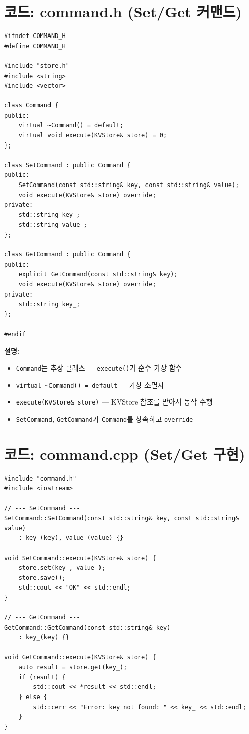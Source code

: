 \documentclass[11pt,a4paper]{book}
\newcommand{\file}[1]{\texttt{#1}}
\newcommand{\code}[1]{\texttt{#1}}
\begin{document}
\section{코드: command.h (Set/Get 커맨드)}

\begin{lstlisting}[style=cpp,title={\file{src/command.h}}]
#ifndef COMMAND_H
#define COMMAND_H

#include "store.h"
#include <string>
#include <vector>

class Command {
public:
    virtual ~Command() = default;
    virtual void execute(KVStore& store) = 0;
};

class SetCommand : public Command {
public:
    SetCommand(const std::string& key, const std::string& value);
    void execute(KVStore& store) override;
private:
    std::string key_;
    std::string value_;
};

class GetCommand : public Command {
public:
    explicit GetCommand(const std::string& key);
    void execute(KVStore& store) override;
private:
    std::string key_;
};

#endif
\end{lstlisting}

\textbf{설명:}
\begin{itemize}[nosep]
\item \code{Command}는 추상 클래스 — \code{execute()}가 순수 가상 함수
\item \code{virtual \~{}Command() = default} — 가상 소멸자
\item \code{execute(KVStore\& store)} — KVStore 참조를 받아서 동작 수행
\item \code{SetCommand}, \code{GetCommand}가 \code{Command}를 상속하고 \code{override}
\end{itemize}

\section{코드: command.cpp (Set/Get 구현)}

\begin{lstlisting}[style=cpp,title={\file{src/command.cpp}}]
#include "command.h"
#include <iostream>

// --- SetCommand ---
SetCommand::SetCommand(const std::string& key, const std::string& value)
    : key_(key), value_(value) {}

void SetCommand::execute(KVStore& store) {
    store.set(key_, value_);
    store.save();
    std::cout << "OK" << std::endl;
}

// --- GetCommand ---
GetCommand::GetCommand(const std::string& key)
    : key_(key) {}

void GetCommand::execute(KVStore& store) {
    auto result = store.get(key_);
    if (result) {
        std::cout << *result << std::endl;
    } else {
        std::cerr << "Error: key not found: " << key_ << std::endl;
    }
}
\end{lstlisting}
\end{document}
